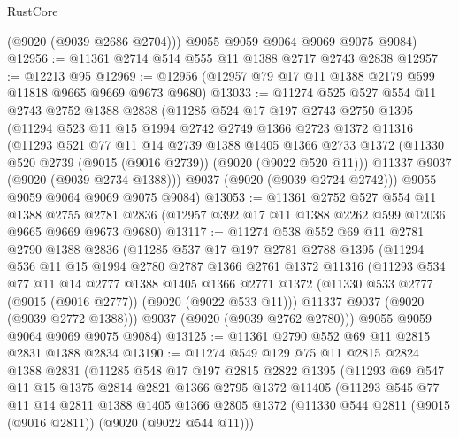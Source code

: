 \begin{lexlean}{RustCore}
\begin{coremodule}
        (@9020 (@9039 @2686 @2704)))
      @9055
      @9059
      @9064
      @9069
      @9075
      @9084)
@12956 := @11361 @2714 @514 @555 @11 @1388 @2717 @2743 @2838
@12957 := @12213 @95
@12969 := @12956 (@12957 @79 @17 @11 @1388 @2179 @599 @11818 @9665 @9669 @9673 @9680)
@13033 := @11274
    @525
    @527
    @554
    @11
    @2743
    @2752
    @1388
    @2838
    (@11285
      @524
      @17
      @197
      @2743
      @2750
      @1395
      (@11294
        @523
        @11
        @15
        @1994
        @2742
        @2749
        @1366
        @2723
        @1372
        @11316
        (@11293
          @521
          @77
          @11
          @14
          @2739
          @1388
          @1405
          @1366
          @2733
          @1372
          (@11330 @520 @2739 (@9015 (@9016 @2739)) (@9020 (@9022 @520 @11)))
          @11337
          @9037
          (@9020 (@9039 @2734 @1388)))
        @9037
        (@9020 (@9039 @2724 @2742)))
      @9055
      @9059
      @9064
      @9069
      @9075
      @9084)
@13053 := @11361
    @2752
    @527
    @554
    @11
    @1388
    @2755
    @2781
    @2836
    (@12957 @392 @17 @11 @1388 @2262 @599 @12036 @9665 @9669 @9673 @9680)
@13117 := @11274
    @538
    @552
    @69
    @11
    @2781
    @2790
    @1388
    @2836
    (@11285
      @537
      @17
      @197
      @2781
      @2788
      @1395
      (@11294
        @536
        @11
        @15
        @1994
        @2780
        @2787
        @1366
        @2761
        @1372
        @11316
        (@11293
          @534
          @77
          @11
          @14
          @2777
          @1388
          @1405
          @1366
          @2771
          @1372
          (@11330 @533 @2777 (@9015 (@9016 @2777)) (@9020 (@9022 @533 @11)))
          @11337
          @9037
          (@9020 (@9039 @2772 @1388)))
        @9037
        (@9020 (@9039 @2762 @2780)))
      @9055
      @9059
      @9064
      @9069
      @9075
      @9084)
@13125 := @11361 @2790 @552 @69 @11 @2815 @2831 @1388 @2834
@13190 := @11274
    @549
    @129
    @75
    @11
    @2815
    @2824
    @1388
    @2831
    (@11285
      @548
      @17
      @197
      @2815
      @2822
      @1395
      (@11293
        @69
        @547
        @11
        @15
        @1375
        @2814
        @2821
        @1366
        @2795
        @1372
        @11405
        (@11293
          @545
          @77
          @11
          @14
          @2811
          @1388
          @1405
          @1366
          @2805
          @1372
          (@11330 @544 @2811 (@9015 (@9016 @2811)) (@9020 (@9022 @544 @11)))

\end{coremodule}
\end{lexlean}
